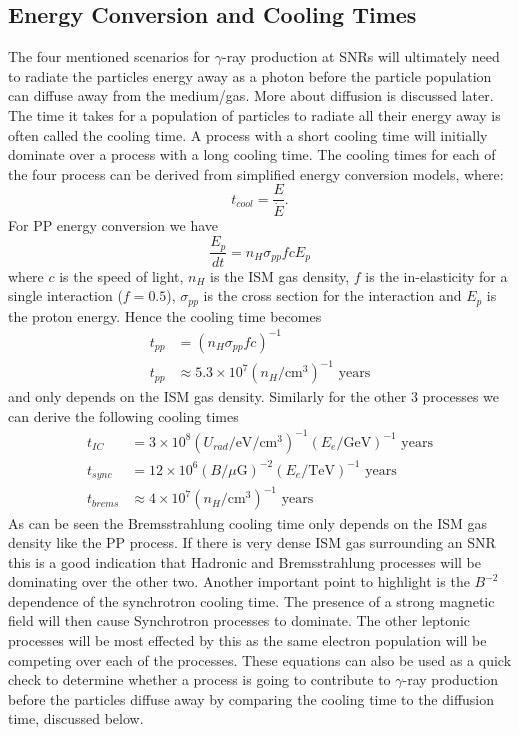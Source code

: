 \documentclass[12pt,a4paper]{article}
\begin{document}
\subsection{Energy Conversion and Cooling Times}
The four mentioned scenarios for $\gamma$-ray production at SNRs will ultimately need to radiate the particles energy away as a photon before the particle population can diffuse away from the medium/gas. More about diffusion is discussed later. The time it takes for a population of particles to radiate all their energy away is often called the cooling time. A process with a short cooling time will initially dominate over a process with a long cooling time. The cooling times for each of the four process can be derived from simplified energy conversion models, where:
\begin{equation}
t_{cool} = \dfrac{E}{\dot{E}} .
\end{equation}
For PP energy conversion we have 
\begin{equation}
\dfrac{E_p}{dt} = n_H \sigma_{pp} f c E_p
\end{equation}
where $c$ is the speed of light, $n_H$ is the ISM gas density, $f$ is the in-elasticity for a single interaction ($f = 0.5$), $\sigma_{pp}$ is the cross section for the interaction and $E_p$ is the proton energy. Hence the cooling time becomes
\begin{equation} \label{eq:cooltimeshad}
\begin{split}
t_{pp} &= (n_H \sigma_{pp} f c)^{-1} \\
t_{pp} &\approx 5.3 \times 10^7 (n_H/\text{cm}^3)^{-1} \text{ years}
\end{split}
\end{equation}
and only depends on the ISM gas density. Similarly for the other 3 processes we can derive the following cooling times
\begin{equation} \label{eq:cooltimeslep}
\begin{split}
t_{IC} &= 3 \times 10^8 (U_{rad}/\text{eV}/\text{cm}^3)^{-1} (E_e/\text{GeV})^{-1} \text{ years} \\
t_{sync} &= 12 \times 10^6 (B/\mu\text{G})^{-2} (E_e/\text{TeV})^{-1} \text{ years} \\
t_{brems} &\approx 4 \times 10^7 (n_H/\text{cm}^3)^{-1} \text{ years}
\end{split}
\end{equation}
As can be seen the Bremsstrahlung cooling time only depends on the ISM gas density like the PP process. If there is very dense ISM gas surrounding an SNR this is a good indication that Hadronic and Bremsstrahlung processes will be dominating over the other two. Another important point to highlight is the $B^{-2}$ dependence of the synchrotron cooling time. The presence of a strong magnetic field will then cause Synchrotron processes to dominate. The other leptonic processes will be most effected by this as the same electron population will be competing over each of the processes. These equations can also be used as a quick check to determine whether a process is going to contribute to $\gamma$-ray production before the particles diffuse away by comparing the cooling time to the diffusion time, discussed below. 
\end{document}
